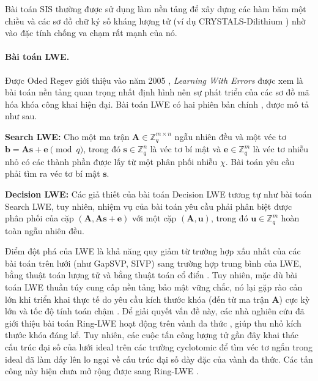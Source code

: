 \documentclass[../LuanVan.tex]{subfiles}
\begin{document}
Bài toán SIS thường được sử dụng làm nền tảng để xây dựng các hàm băm một chiều \cite{Ajtai96} và các sơ đồ chữ ký số kháng lượng tử (ví dụ CRYSTALS-Dilithium \cite{Ducas18}) nhờ vào đặc tính chống va chạm rất mạnh của nó.

\paragraph{Bài toán LWE.} Được Oded Regev giới thiệu vào năm 2005 \cite{Regev05}, \textit{Learning With Errors} được xem là bài toán nền tảng quan trọng nhất định hình nên sự phát triển của các sơ đồ mã hóa khóa công khai hiện đại. Bài toán LWE có hai phiên bản chính \cite{Bergami16}, được mô tả như sau.
\begin{bt}
    \textbf{Search LWE:} Cho một ma trận $\mathbf{A} \in \mathbb{Z}_q^{m \times n}$ ngẫu nhiên đều và một véc tơ $\mathbf{b} = \mathbf{A}\mathbf{s} + \mathbf{e} \pmod q$, trong đó $\mathbf{s} \in \mathbb{Z}_q^n$ là véc tơ bí mật và $\mathbf{e} \in \mathbb{Z}_q^m$ là véc tơ nhiễu nhỏ có các thành phần được lấy từ một phân phối nhiễu $\chi$. Bài toán yêu cầu phải tìm ra véc tơ bí mật $\mathbf{s}$.
    \label{searchLWE}
\end{bt}

\begin{bt}
    \textbf{Decision LWE:} Các giả thiết của bài toán Decision LWE tương tự như bài toán Search LWE, tuy nhiên, nhiệm vụ của bài toán yêu cầu phải phân biệt được phân phối của cặp $(\mathbf{A}, \mathbf{A}\mathbf{s} + \mathbf{e})$ với một cặp $(\mathbf{A}, \mathbf{u})$, trong đó $\mathbf{u}\in\mathbb{Z}_q^m$ hoàn toàn ngẫu nhiên đều.
\end{bt}

Điểm đột phá của LWE là khả năng quy giảm từ trường hợp xấu nhất của các bài toán trên lưới (như GapSVP, SIVP) sang trường hợp trung bình của LWE, bằng thuật toán lượng tử \cite{Regev05} và bằng thuật toán cổ điển \cite{Peikert09, BLPRS13}.
Tuy nhiên, mặc dù bài toán LWE thuần túy cung cấp nền tảng bảo mật vững chắc, nó lại gặp rào cản lớn khi triển khai thực tế do yêu cầu kích thước khóa (đến từ ma trận $\mathbf{A}$) cực kỳ lớn và tốc độ tính toán chậm \cite{Bos18}. Để giải quyết vấn đề này, các nhà nghiên cứu đã giới thiệu bài toán Ring-LWE hoạt động trên vành đa thức \cite{LyubashevskyPR13}, giúp thu nhỏ kích thước khóa đáng kể.
Tuy nhiên, các cuộc tấn công lượng tử gần đây khai thác cấu trúc đại số của lưới ideal trên các trường cyclotomic để tìm véc tơ ngắn trong ideal \cite{CramerDPR16, CramerDW17} đã làm dấy lên lo ngại về cấu trúc đại số dày đặc của vành đa thức. Các tấn công này hiện chưa mở rộng được sang Ring-LWE \cite{Bos18}.
\end{document}
